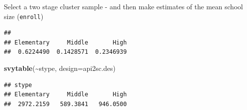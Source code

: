 \documentclass[
]{book}
\newenvironment{Shaded}{\begin{snugshade}}{\end{snugshade}}
\newcommand{\AttributeTok}[1]{\textcolor[rgb]{0.13,0.29,0.53}{#1}}
\newcommand{\DecValTok}[1]{\textcolor[rgb]{0.00,0.00,0.81}{#1}}
\newcommand{\FloatTok}[1]{\textcolor[rgb]{0.00,0.00,0.81}{#1}}
\newcommand{\FunctionTok}[1]{\textcolor[rgb]{0.13,0.29,0.53}{\textbf{#1}}}
\newcommand{\NormalTok}[1]{#1}
\newcommand{\OtherTok}[1]{\textcolor[rgb]{0.56,0.35,0.01}{#1}}
\newcommand{\SpecialCharTok}[1]{\textcolor[rgb]{0.81,0.36,0.00}{\textbf{#1}}}
\newcommand{\StringTok}[1]{\textcolor[rgb]{0.31,0.60,0.02}{#1}}
\begin{document}
Select a two stage cluster sample - and then make estimates of the mean school
size (\texttt{enroll})

\begin{Shaded}
\end{Shaded}

\begin{verbatim}
## 
## Elementary     Middle       High 
##  0.6224490  0.1428571  0.2346939
\end{verbatim}

\begin{Shaded}
\begin{Highlighting}[]
\FunctionTok{svytable}\NormalTok{(}\SpecialCharTok{\textasciitilde{}}\NormalTok{stype, }\AttributeTok{design=}\NormalTok{api2sc.des)}
\end{Highlighting}
\end{Shaded}

\begin{verbatim}
## stype
## Elementary     Middle       High 
##  2972.2159   589.3841   946.0500
\end{verbatim}

\begin{Shaded}
\end{Shaded}
\end{document}
